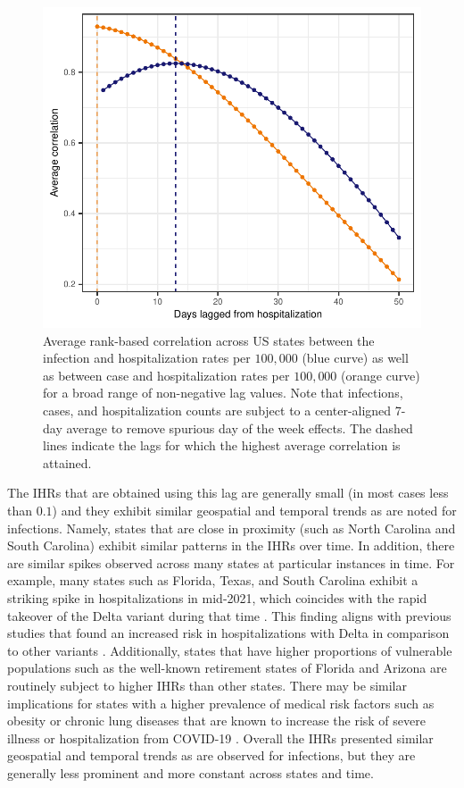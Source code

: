 \documentclass{article}
\begin{document}
\begin{figure}[!tb]
\centering
    \includegraphics[width=.80\textwidth, height=.44\textheight]{infect_case_hosp_lag_corr.pdf} 
    \caption{Average rank-based correlation across US states between the infection and hospitalization rates per $100,000$ (blue curve) as well as between case and hospitalization rates per $100,000$ (orange curve) for a broad range of non-negative lag values. Note that infections, cases, and hospitalization counts are subject to a center-aligned 7-day average to remove spurious day of the week effects. The dashed lines indicate the lags for which the highest average correlation is attained.}
    \label{fig:infect_case_hosp_lag_corr}
\end{figure}

The IHRs that are obtained using this lag are generally small (in most cases less than $0.1$) and they exhibit similar geospatial and temporal trends as are noted for infections. Namely, states that are close in proximity (such as North Carolina and South Carolina) exhibit similar patterns in the IHRs over time. In addition, there are similar spikes observed across many states at particular instances in time. For example, many states such as Florida, Texas, and South Carolina exhibit a striking spike in hospitalizations in mid-2021, which coincides with the rapid takeover of the Delta variant during that time \citep{hodcroft2021covariants}. This finding aligns with previous studies that found an increased risk in hospitalizations with Delta in comparison to other variants \citep{twohig2022hospital, nyberg2022comparative}. Additionally, states that have higher proportions of vulnerable populations such as the well-known retirement states of Florida and Arizona are routinely subject to higher IHRs than other states. There may be similar implications for states with a higher prevalence of medical risk factors such as obesity or chronic lung diseases that are known to increase the risk of severe illness or hospitalization from COVID-19 \citep{phc2020people, cdc2020people}. Overall the IHRs presented similar geospatial and temporal trends as are observed for infections, but they are generally less prominent and more constant across states and time. %
\end{document}
